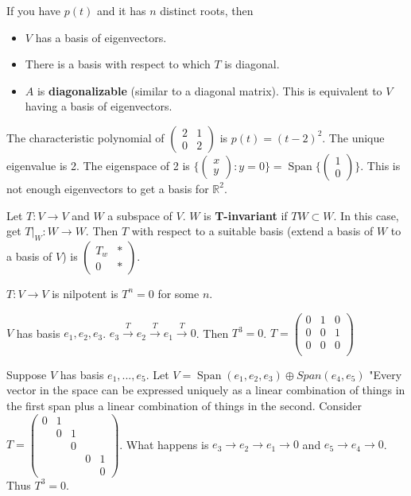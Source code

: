 \documentclass{article}
\newcommand{\vocab}[1]{\textbf{\color{blue!90}\boldmath #1}}
\newcommand{\R}{\mathbb{R}}
\newcommand{\ra}[1][]{\xrightarrow{#1}}
\DeclareMathOperator{\Span}{Span}
\begin{document}
\begin{corollary}
If you have $p(t)$ and it has $n$ distinct roots, then
\begin{itemize}
    \item $V$ has a basis of eigenvectors.
    \item There is a basis with respect to which $T$ is diagonal.
    \item $A$ is \vocab{diagonalizable} (similar to a diagonal matrix). This is equivalent to $V$ having a basis of eigenvectors.
\end{itemize}
\end{corollary}
\begin{example}
The characteristic polynomial of $\begin{pmatrix}
2&1\\
0&2
\end{pmatrix}$ is $p(t)=(t-2)^2$. The unique eigenvalue is 2. The eigenspace of 2 is $\{\begin{pmatrix}
x\\y
\end{pmatrix}:y=0\}=\Span\{\begin{pmatrix}
1\\0
\end{pmatrix}\}$. This is not enough eigenvectors to get a basis for $\R^2$.
\end{example}
\begin{definition}
Let $T:V\ra V$ and $W$ a subspace of $V$. $W$ is \vocab{T-invariant} if $TW\subset W$. In this case, get $T|_W:W\ra W$. Then $T$ with respect to a suitable basis (extend a basis of $W$ to a basis of $V$) is $\begin{pmatrix}
T_w&*\\
0&*
\end{pmatrix}$.
\end{definition}
\begin{definition}
$T:V\ra V$ is nilpotent is $T^n=0$ for some $n$.
\end{definition}
\begin{example}
$V$ has basis $e_1,e_2,e_3$. $e_3\ra[T]e_2\ra[T]e_1\ra[T]0$. Then $T^3=0$. $T=\begin{pmatrix}
0&1&0\\
0&0&1\\
0&0&0\\
\end{pmatrix}$
\end{example}
\begin{example}
Suppose $V$ has basis $e_1,...,e_5$. Let $V=\Span(e_1,e_2,e_3)\oplus Span(e_4,e_5)$ "Every vector in the space can be expressed uniquely as a linear combination of things in the first span plus a linear combination of things in the second. Consider $T=\begin{pmatrix}
0&1&&&\\
&0&1&&\\
&&0&&\\
&&&0&1\\
&&&&0
\end{pmatrix}$. What happens is $e_3\ra e_2\ra e_1\ra 0$ and $e_5\ra e_4\ra 0$. Thus $T^3=0$.
\end{example}
\end{document}
